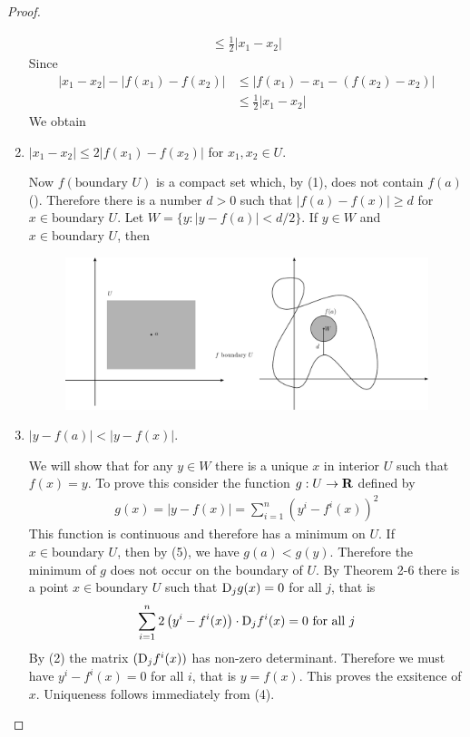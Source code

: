\begin{proof}
\begin{enumerate}[label={\upshape(\arabic*)}]
\begin{align*}
                \le \frac{1}{2}\left|x_1-x_2\right|
            \end{align*}
            Since 
            \begin{align*}
                |x_1-x_2| - |f(x_1) - f(x_2)| 
                & \le |f(x_1) - x_1 - \left(f(x_2) - x_2\right)| \\
                & \le \frac12 |x_1 - x_2|
            \end{align*}
            We obtain 
        \item $|x_1 - x_2|\le 2|f(x_1) - f(x_2)|$ for $x_1, x_2 \in U$.\par 
            Now $f(\text{boundary } U)$ is a compact set which, by (1), does not 
            contain $f(a)$ (). Therefore there is a number $d>0$ such that 
            $|f(a) - f(x)|\ge d$ for $x\in \text{boundary } U$. Let $W= \{y:|y-f(a)| < d/2\}$. 
            If $y\in W$ and $x\in \text{boundary } U$, then 
            \begin{figure}[!htb]
                \centering
                \includegraphics[width=.95\linewidth]{./pics/Fig2-3.pdf}
                \caption{}
                \label{Fig 2-3}
            \end{figure}
        \item $|y-f(a)| < |y-f(x)|$.\par 
            We will show that for any $y\in W$ there is a unique $x$ in
            interior $U$ such that $f(x) = y$. To prove this consider the
            function $g:U\to \mathbf{R}$ defined by 
            \begin{align*}
                g(x) 
                = |y-f(x)|
                = \sum_{i=1}^{n}{\left(y^i - f^i(x)\right)^2} 
            \end{align*}
            This function is continuous and therefore has a minimum on $U$. If $x\in \text{boundary } U$, then 
            by (5), we have $g(a)< g(y)$. Therefore the minimum of $g$ does not occur on the boundary 
            of $U$. By Theorem 2-6 there is a point $x\in\text{boundary } U$ such that $\mathrm{D}_jg(x) = 0$ for all 
            $j$, that is 
            \begin{align*}
                \sum_{i=1}^{n}{2\left(y^i - f^i(x)\right)\cdot \mathrm{D}_jf^i(x)} = 0 \text{ for all } j 
            \end{align*}
            By (2) the matrix $(\mathrm{D}_jf^i(x))$ has non-zero determinant. Therefore we must have $y^i - f^i(x) = 0$
            for all $i$, that is $y=f(x)$. This proves the exsitence of $x$. Uniqueness follows immediately 
            from (4). 


\end{enumerate}
\end{proof}
